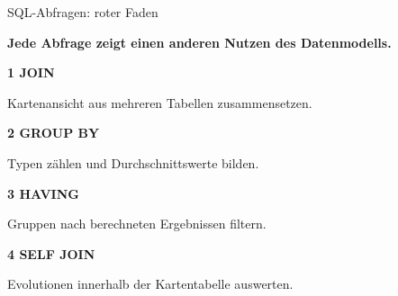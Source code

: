 \documentclass[aspectratio=169,11pt]{beamer}
\begin{document}
\begin{frame}{SQL-Abfragen: roter Faden}
  \begin{panel}[colback=softblue,colframe=blue!35]
    {\Large\bfseries Jede Abfrage zeigt einen anderen Nutzen des Datenmodells.}
  \end{panel}
  \vspace{0.35cm}
  \begin{minipage}[t]{0.24\textwidth}
    \begin{panel}[height=4.3cm]
      {\bfseries 1 JOIN}\par
      \small Kartenansicht aus mehreren Tabellen zusammensetzen.
    \end{panel}
  \end{minipage}\hfill
  \begin{minipage}[t]{0.24\textwidth}
    \begin{panel}[height=4.3cm]
      {\bfseries 2 GROUP BY}\par
      \small Typen z\"ahlen und Durchschnittswerte bilden.
    \end{panel}
  \end{minipage}\hfill
  \begin{minipage}[t]{0.24\textwidth}
    \begin{panel}[height=4.3cm]
      {\bfseries 3 HAVING}\par
      \small Gruppen nach berechneten Ergebnissen filtern.
    \end{panel}
  \end{minipage}\hfill
  \begin{minipage}[t]{0.24\textwidth}
    \begin{panel}[height=4.3cm]
      {\bfseries 4 SELF JOIN}\par
      \small Evolutionen innerhalb der Kartentabelle auswerten.
    \end{panel}
  \end{minipage}
\end{frame}
\end{document}
